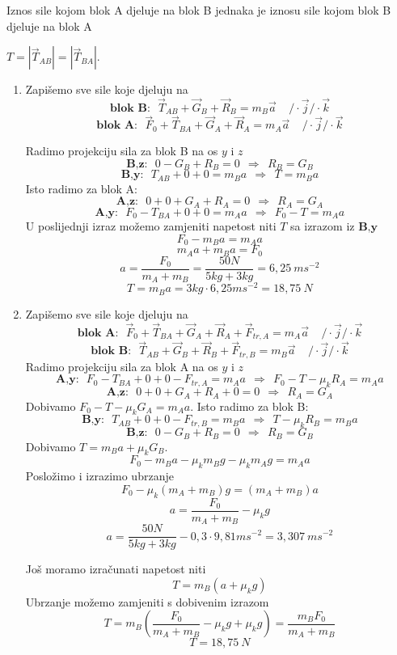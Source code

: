 
Iznos sile kojom blok A djeluje na blok B jednaka je iznosu sile kojom blok B djeluje na blok A 

$T=|\vec{T}_{AB}|=|\vec{T}_{BA}|$.

\begin{enumerate}[label=\alph*)]
  \item Zapišemo sve sile koje djeluju na  $$\textbf{blok B:}\ \ \ \vec{T}_{AB} + \vec{G}_B+\vec{R}_B=m_B\vec{a}\ \ \ \ \  /\cdot\vec{j}/\cdot\vec{k}$$
  $$\textbf{blok A:}\ \ \ \vec{F}_0+ \vec{T}_{BA} + \vec{G}_A+\vec{R}_A=m_A\vec{a} \ \ \ \ \  /\cdot\vec{j}/\cdot\vec{k} $$
  
  Radimo projekciju sila za blok B na os $y$ i $z$ 
  $$ \textbf{B,z:} \ \ \ 0 - G_B+R_B=0   \ \ \Rightarrow \ \  R_B=G_B$$
   $$\textbf{B,y:}\ \ \ T_{AB}+0+0=m_Ba \ \ \Rightarrow \ \ T=m_B a $$
  Isto radimo za blok A:
  $$ \textbf{A,z:}\ \ \ 0+0+G_A+R_A=0 \ \ \Rightarrow \ \  R_A=G_A  $$
   $$ \textbf{A,y:}\ \ \ F_0-T_{BA}+ 0+ 0=m_A a \ \ \Rightarrow \ \   F_0-T=m_Aa $$
 U poslijednji izraz možemo zamjeniti napetost niti $T$ sa izrazom iz $\textbf{B,y}$ 
 $$ F_0-m_B a=m_Aa $$
   $$ m_A a + m_B a =F_0$$
   $$ a= \frac{F_0}{m_A+m_B}= \frac{50N}{5kg+3kg}=6,25\ ms^{-2}$$
$$ T=m_B a=3kg\cdot 6,25ms^{-2}=18,75\ N $$   
\item
Zapišemo sve sile koje djeluju na $$\textbf{blok A:}\ \ \ \vec{F}_0+ \vec{T}_{BA} + \vec{G}_A+\vec{R}_A + \vec{F}_{tr,A}=m_A\vec{a}  \ \ \ \ \  /\cdot\vec{j}/\cdot\vec{k}$$
$$\textbf{blok B:}\ \ \ \vec{T}_{AB} + \vec{G}_B+\vec{R}_B+\vec{F}_{tr,B}=m_B\vec{a}\ \ \ \ \  /\cdot\vec{j}/\cdot\vec{k}$$
 Radimo projekciju sila za blok A na os $y$ i $z$ 
  $$ \textbf{A,y:}\ \ \ F_0-T_{BA}+ 0+ 0-F_{tr,A}=m_A a \ \ \Rightarrow \ \   F_0-T-\mu_kR_A=m_Aa $$
 $$ \textbf{A,z:}\ \ \ 0+0+G_A+R_A+0=0 \ \ \Rightarrow \ \  R_A=G_A  $$
Dobivamo $F_0-T-\mu_kG_A=m_Aa $. Isto radimo za blok B:
$$\textbf{B,y:}\ \ \ T_{AB}+0+0-F_{tr,B}=m_Ba \ \ \Rightarrow \ \ T-\mu_kR_B=m_B a $$
$$ \textbf{B,z:} \ \ \ 0 - G_B+R_B=0   \ \ \Rightarrow \ \  R_B=G_B$$
Dobivamo $T=m_Ba+\mu_kG_B$.
$$F_0 -m_Ba-\mu_km_Bg -\mu_km_Ag=m_Aa$$
Posložimo i izrazimo ubrzanje
 $$F_0-\mu_k(m_A+m_B)g=(m_A+m_B)a  $$
$$a=\frac{F_0}{m_A+m_B} -\mu_kg $$ 
$$ a=\frac{50N}{5kg+3kg} -0,3\cdot9,81ms^{-2}=3,307\ ms^{-2}$$

Još moramo izračunati napetost niti
$$ T= m_B(a+\mu_kg) $$ Ubrzanje možemo zamjeniti s dobivenim izrazom
$$ T= m_B(\frac{F_0}{m_A+m_B} -\mu_kg+\mu_kg)=\frac{m_BF_0}{m_A+m_B} $$
$$T=18,75\ N $$
   \end{enumerate}
  
